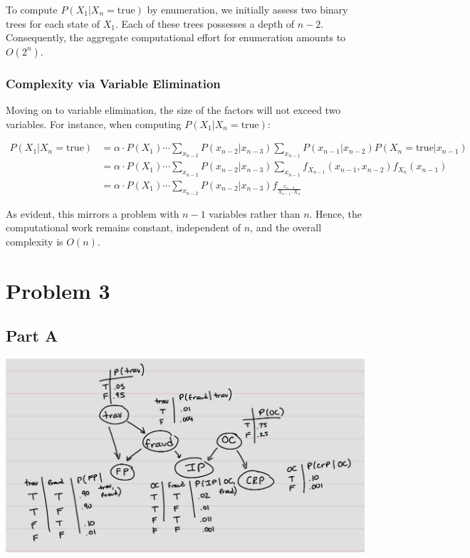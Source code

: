 \documentclass[12pt]{article}
\begin{document}
To compute 
$P(X_1 | X_n = \text{true})$ 
by enumeration, 
we initially assess two binary trees for each state of $X_1$. 
Each of these trees possesses a depth of $n - 2$. 
Consequently, 
the aggregate computational effort for enumeration amounts to $\boxed{O(2^n)}$.

\subsubsection{Complexity via Variable Elimination}

Moving on to variable elimination, 
the size of the factors will not exceed two variables. 
For instance, 
when computing $P(X_1 | X_n = \text{true})$:

\begin{align*}
P(X_1 | X_n = \text{true})
& = \alpha \cdot P(X_1) \cdots \sum_{x_{n-2}} P(x_{n-2} | x_{n-3}) \sum_{x_{n-1}} P(x_{n-1} | x_{n-2}) P(X_n = \text{true} | x_{n-1}) \\
& = \alpha \cdot P(X_1) \cdots \sum_{x_{n-2}} P(x_{n-2} | x_{n-3}) \sum_{x_{n-1}} f_{X_{n-1}}(x_{n-1}, x_{n-2}) f_{X_n}(x_{n-1}) \\
& = \alpha \cdot P(X_1) \cdots \sum_{x_{n-2}} P(x_{n-2} | x_{n-3}) f_{\frac{x_{n-2}}{X_{n-1} \cdot X_n}}
\end{align*}

As evident, 
this mirrors a problem with $n-1$ variables rather than $n$. 
Hence, 
the computational work remains constant, 
independent of $n$, 
and the overall complexity is $\boxed{O(n)}$.


\section{Problem 3}

\subsection{Part A}

\includegraphics[scale=0.5, keepaspectratio]{part3a.png}
\end{document}
